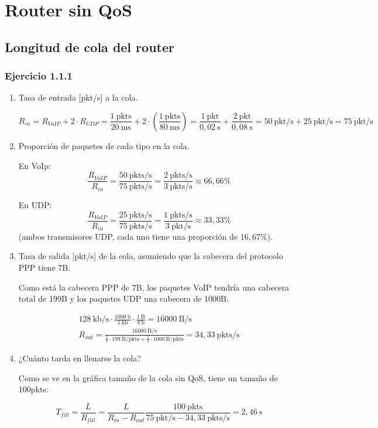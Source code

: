 \chapter{Router sin QoS}
\label{chap:sinqos}

\section{Longitud de cola del router}

\subsection{Ejercicio 1.1.1}

\renewcommand{\theenumi}{\alph{enumi}}
\begin{enumerate}
    \item Tasa de entrada [pkt/s] a la cola.

\[
\label{eq:sinqos_tasa_entrada}
R_{in} = R_{VoIP} + 2 \cdot R_{UDP} = \frac{1~\mathrm{pkts}}{20~\text{ms}} + 2\cdot (\frac{1 ~ \text{pkts} }{80 ~ \text{ms} }) = \frac{1~\mathrm{pkt}}{0,02~\text{s}} + \frac{2~\mathrm{pkt}}{0,08~\text{s}} = 50 ~ \text{pkt/s} + 25 ~ \text{pkt/s} = 75 ~ \text{pkt/s}
\]

    \item Proporción de paquetes de cada tipo en la cola.

    En VoIp: \[ \frac{R_{VoIP}}{R_{in}} = \frac{50~\text{pkts/s}}{75~\text{pkts/s}} = \frac{2~\text{pkts/s}}{3~\text{pkts/s}}  \approx 66,66\%\]

    En UDP: \[ \frac{R_{VoIP}}{R_{in}} = \frac{25~\text{pkts/s}}{75~\text{pkts/s}} = \frac{1~\text{pkts/s}}{3~\text{pkt/s}} \approx 33,33\% \] 
            (ambos transmisores UDP, cada uno tiene una proporción de \( 16,67\% \)).

    \item Tasa de salida [pkt/s] de la cola, asumiendo que la cabecera del protocolo PPP tiene 7B.
 
    Como está la cabecera PPP de 7B, los paquetes VoIP tendría una cabecera total de 199B y los paquetes UDP una cabecera de 1000B.

    \begin{eqnarray}
        \label{eq:senqos_tasa_salida}
        128~\text{kb/s} \cdot \frac{1000~\text{b}}{1~\text{kb}} \cdot \frac{1~\text{B}}{8~\text{b}} = 16000~\text{B/s} \\
        R_{out} = \frac{16000~\text{B/s}}{ \frac{2}{3} \cdot  199~\text{B/pkts} + \frac{1}{3} \cdot 1000~\text{B/pkts}} = 34,33~\text{pkts/s}
    \end{eqnarray}


    \item ¿Cuánto tarda en llenarse la cola?
    
    Como se ve en la gráfica tamaño de la cola sin QoS, tiene un tamaño de 100pkts:

    \[
    \label{eq:sinqos_tiempo_llenado}
      T_{fill} = \frac{L}{R_{fill}} = \frac{L}{R_{in} - R_{out}} \frac{100~\text{pkts}}{75~\text{pkt/s} - 34,33~\text{pkts/s}} = 2,46~\text{s}
    \]


\end{enumerate}

